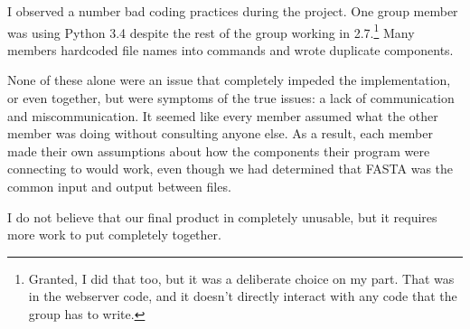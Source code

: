 \documentclass[10pt,letterpaper]{article}
\begin{document}
I observed a number bad coding practices during the project.
One group member was using Python 3.4 despite the rest of the group working in 2.7.\footnote{Granted, I did that too, but it was a deliberate choice on my part.  That was in the webserver code, and it doesn't directly interact with any code that the group has to write.}
Many members hardcoded file names into commands and wrote duplicate components.


None of these alone were an issue that completely impeded the implementation, or even together, but were symptoms of the true issues:   a lack of communication and miscommunication.
It seemed like every member assumed what the other member was doing without consulting anyone else.
As a result, each member made their own assumptions about how the components their program were connecting to would work, even though we had determined that FASTA was the common input and output between files.


I do not believe that our final product in completely unusable, but it requires more work to put completely together.



\end{document}
